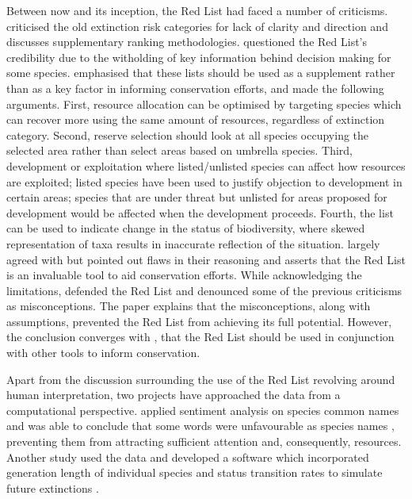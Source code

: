 Between now and its inception, the Red List had faced a number of criticisms. \textcite{master1991assessing} criticised the old extinction risk categories for lack of clarity and direction and discusses supplementary ranking methodologies. \textcite{mrosovsky1997iucn} questioned the Red List's credibility due to the witholding of key information behind decision making for some species. \textcite{possingham2002limits} emphasised that these lists should be used as a supplement rather than as a key factor in informing conservation efforts, and made the following arguments. First, resource allocation can be optimised by targeting species which can recover more using the same amount of resources, regardless of extinction category. Second, reserve selection should look at all species occupying the selected area rather than select areas based on umbrella species. Third, development or exploitation where listed/unlisted species can affect how resources are exploited; listed species have been used to justify objection to development in certain areas; species that are under threat but unlisted for areas proposed for development would be affected when the development proceeds. Fourth, the list can be used to indicate change in the status of biodiversity, where skewed representation of taxa results in inaccurate reflection of the situation. \textcite{lamoreux2003value} largely agreed with \textcite{possingham2002limits} but pointed out flaws in their reasoning and asserts that the Red List is an invaluable tool to aid conservation efforts. While acknowledging the limitations, \textcite{rodrigues2006value} defended the Red List and denounced some of the previous criticisms as misconceptions. The paper explains that the misconceptions, along with assumptions, prevented the Red List from achieving its full potential. However, the conclusion converges with \textcite{possingham2002limits}, that the Red List should be used in conjunction with other tools to inform conservation. 

Apart from the discussion surrounding the use of the Red List revolving around human interpretation, two projects have approached the data from a computational perspective. \textcite{gregg2020many} applied sentiment analysis on species common names and was able to conclude that some words were unfavourable as species names \parencite{gregg2020many}, preventing them from attracting sufficient attention and, consequently, resources. Another study used the data and developed a software which incorporated generation length of individual species and status transition rates to simulate future extinctions \parencite{andermann2021iucn_sim}.

